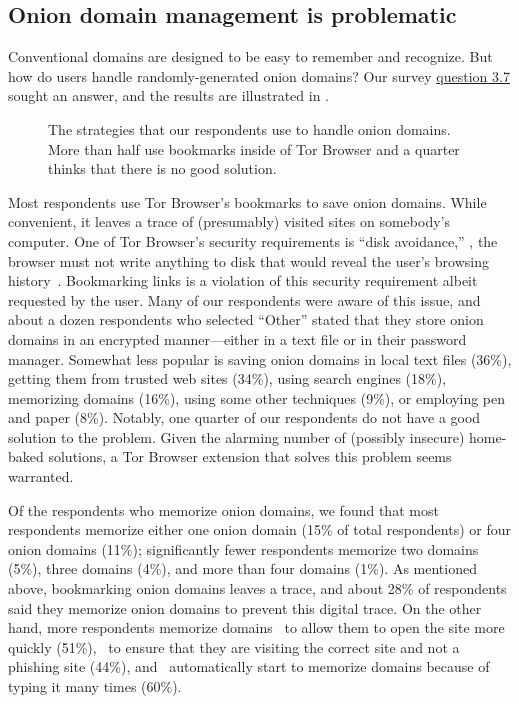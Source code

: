 \subsection{Onion domain management is problematic}

Conventional domains are designed to be easy to remember and recognize.  But how
do users handle randomly-generated onion domains?  Our survey
\hyperref[q3_7]{question 3.7} sought an answer, and the results are illustrated
in .

\begin{figure}[t]
    \centering
    
    \caption{The strategies that our respondents use to handle onion domains.
    More than half use bookmarks inside of Tor Browser and a quarter thinks that
    there is no good solution.}
    \label{fig:onion-domain-mgmt}
\end{figure}

Most respondents use Tor Browser's bookmarks to save onion domains.  While
convenient, it leaves a trace of (presumably) visited sites on somebody's
computer.  One of Tor Browser's security requirements is ``disk avoidance,''
\ie, the browser must not write anything to disk that would reveal the user's
browsing history~\cite[\S~2.1]{Perry2017a}.  Bookmarking links is a violation of
this security requirement albeit requested by the user.  Many of our respondents
were aware of this issue, and about a dozen respondents who selected ``Other''
stated that they store onion domains in an encrypted manner---either in a text
file or in their password manager.  Somewhat less popular is saving onion
domains in local text files (36\%), getting them from trusted web sites (34\%),
using search engines (18\%), memorizing domains (16\%), using some other
techniques (9\%), or employing pen and paper (8\%).  Notably, one quarter of our
respondents do not have a good solution to the problem.  Given the alarming
number of (possibly insecure) home-baked solutions, a Tor Browser extension that
solves this problem seems warranted.

Of the respondents who memorize onion domains, we found that most respondents
memorize either one onion domain (15\% of total respondents) or four onion
domains (11\%); significantly fewer respondents memorize two domains (5\%),
three domains (4\%), and more than four domains (1\%).  As mentioned above,
bookmarking onion domains leaves a trace, and about 28\% of respondents said
they memorize onion domains to prevent this digital trace.  On the other hand,
more respondents memorize domains \first~to allow them to open the site more
quickly (51\%), \second~to ensure that they are visiting the correct site and
not a phishing site (44\%), and \third~automatically start to memorize domains
because of typing it many times (60\%).

